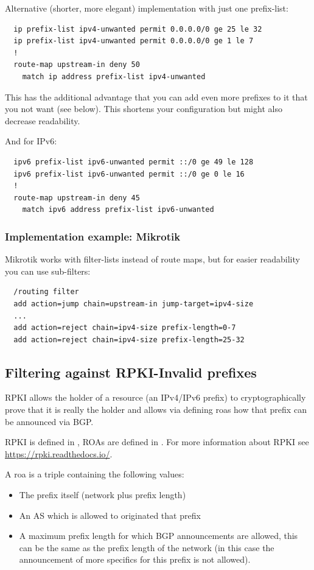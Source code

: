Alternative (shorter, more elegant) implementation with just one prefix-list:
\begin{verbatim}
  ip prefix-list ipv4-unwanted permit 0.0.0.0/0 ge 25 le 32
  ip prefix-list ipv4-unwanted permit 0.0.0.0/0 ge 1 le 7
  !
  route-map upstream-in deny 50
    match ip address prefix-list ipv4-unwanted
\end{verbatim}
This has the additional advantage that you can add even more prefixes to it that you not want (see below). This shortens your configuration but might also decrease readability.

And for IPv6:
\begin{verbatim}
  ipv6 prefix-list ipv6-unwanted permit ::/0 ge 49 le 128
  ipv6 prefix-list ipv6-unwanted permit ::/0 ge 0 le 16
  !
  route-map upstream-in deny 45
    match ipv6 address prefix-list ipv6-unwanted
\end{verbatim}

\subsubsection{Implementation example: Mikrotik}
Mikrotik works with filter-lists instead of route maps, but for easier readability you can use sub-filters:
\begin{verbatim}
  /routing filter
  add action=jump chain=upstream-in jump-target=ipv4-size
  ...
  add action=reject chain=ipv4-size prefix-length=0-7
  add action=reject chain=ipv4-size prefix-length=25-32
\end{verbatim}

\subsection{Filtering against RPKI-Invalid prefixes}
\gls{RPKI} allows the holder of a resource (an IPv4/IPv6 prefix) to cryptographically prove that it is really the holder and allows via defining \glspl{roa} how that prefix can be announced via BGP.

RPKI is defined in , ROAs are defined in . For more information about RPKI see \url{https://rpki.readthedocs.io/}.

A \gls{roa} is a triple containing the following values:
\begin{itemize}
  \item The prefix itself (network plus prefix length)
  \item An \gls{AS} which is allowed to originated that prefix
  \item A maximum prefix length for which BGP announcements are allowed, this can be the same as the prefix length of the network (in this case the announcement of more specifics for this prefix is not allowed).
\end{itemize}


